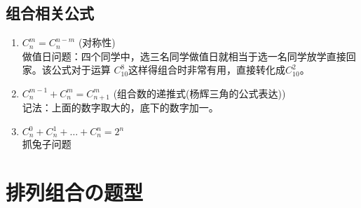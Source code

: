     \subsection{组合相关公式}
    \begin{enumerate}
        \item $C_n^m = C_n^{n-m}$  (对称性) \\ 做值日问题：四个同学中，选三名同学做值日就相当于选一名同学放学直接回家。该公式对于运算 $C_{10}^8$这样得组合时非常有用，直接转化成$C_{10}^2$。
        \item $C_n^{m-1}+C_n^m = C_{n+1}^m$  (组合数的递推式(杨辉三角的公式表达)) \\  记法：上面的数字取大的，底下的数字加一。
        \item $C_n^0 + C_n^1 + \ldots + C_n^n = 2^n$ \\ 抓兔子问题
    \end{enumerate}

\newpage
\section{排列组合の题型}

